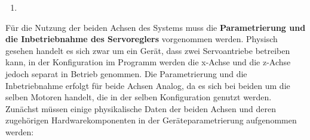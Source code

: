 \documentclass[../../../Bachelorarbeit.tex]{subfiles}
\begin{document}
\begin{itemize}
\begin{enumerate}
\begin{minipage}[t]{\linewidth}
            \label{fig:my-img32}
        \end{minipage}
        \item \begin{minipage}[t]{\linewidth}
            \raggedright
            \label{fig:my-img33}
        \end{minipage}
    \end{enumerate}
\end{itemize}

Für die Nutzung der beiden Achsen des Systems muss die \textbf{Parametrierung und die Inbetriebnahme des Servoreglers} vorgenommen werden. Physisch gesehen handelt es sich zwar um ein Gerät, dass zwei Servoantriebe betreiben kann, in der Konfiguration im Programm werden die x-Achse und die z-Achse jedoch separat in Betrieb genommen. Die Parametrierung und die Inbetriebnahme erfolgt für beide Achsen Analog, da es sich bei beiden um die selben Motoren handelt, die in der selben Konfiguration genutzt werden.\\
Zunächst müssen einige physikalische Daten der beiden Achsen und deren zugehörigen Hardwarekomponenten in der Geräteparametrierung aufgenommen werden:
\end{document}
